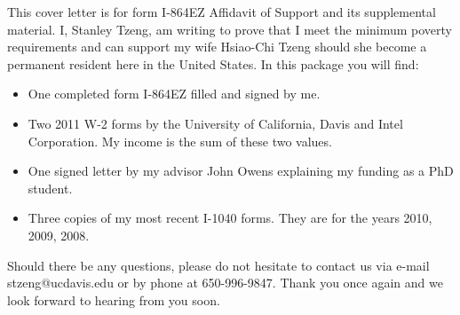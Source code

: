 \documentclass[stdletter]{newlfm}
\begin{document}
 
\begin{newlfm}
This cover letter is for form I-864EZ Affidavit of Support and its supplemental material.  I, Stanley Tzeng, am writing to prove that I meet the minimum poverty requirements and can support my wife Hsiao-Chi Tzeng should she become a permanent resident here in the United States.  In this package you will find:
\begin{itemize}
\item One completed form I-864EZ filled and signed by me.
\item Two 2011 W-2 forms by the University of California, Davis and Intel Corporation.  My income is the sum of these two values.
\item One signed letter by my advisor John Owens explaining my funding as a PhD student.
\item Three copies of my most recent I-1040 forms.  They are for the years 2010, 2009, 2008.  

\end{itemize}

Should there be any questions, please do not hesitate to contact us via e-mail stzeng@ucdavis.edu or by phone at 650-996-9847.  Thank you once again and we look forward to hearing from you soon.
\end{newlfm}
\end{document}
